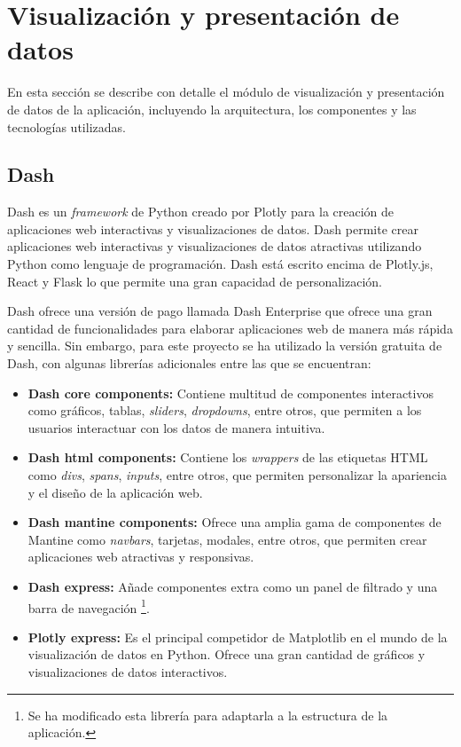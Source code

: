 \section{Visualización y presentación de datos}

En esta sección se describe con detalle el módulo de visualización y presentación de datos de la aplicación, incluyendo la arquitectura, los componentes y las tecnologías utilizadas.

\subsection{Dash}
Dash es un \textit{framework} de Python creado por Plotly para la creación de aplicaciones web interactivas y visualizaciones de datos. Dash permite crear aplicaciones web interactivas y visualizaciones de datos atractivas utilizando Python como lenguaje de programación. Dash está escrito encima de Plotly.js, React y Flask lo que permite una gran capacidad de personalización.

Dash ofrece una versión de pago llamada Dash Enterprise que ofrece una gran cantidad de funcionalidades para elaborar aplicaciones web de manera más rápida y sencilla. Sin embargo, para este proyecto se ha utilizado la versión gratuita de Dash, con algunas librerías adicionales entre las que se encuentran:

\begin{itemize}
	\item \textbf{Dash core components:} Contiene multitud de componentes interactivos como gráficos, tablas, \textit{sliders}, \textit{dropdowns}, entre otros, que permiten a los usuarios interactuar con los datos de manera intuitiva.
	\item \textbf{Dash html components:} Contiene los \textit{wrappers} de las etiquetas HTML como \textit{divs}, \textit{spans}, \textit{inputs}, entre otros, que permiten personalizar la apariencia y el diseño de la aplicación web.
	\item \textbf{Dash mantine components:} Ofrece una amplia gama de componentes de Mantine como \textit{navbars}, tarjetas, modales, entre otros, que permiten crear aplicaciones web atractivas y responsivas.
	\item \textbf{Dash express:} Añade componentes extra como un panel de filtrado y una barra de navegación \footnote{Se ha modificado esta librería para adaptarla a la estructura de la aplicación.}.
	\item \textbf{Plotly express:} Es el principal competidor de Matplotlib en el mundo de la visualización de datos en Python. Ofrece una gran cantidad de gráficos y visualizaciones de datos interactivos.
\end{itemize}

